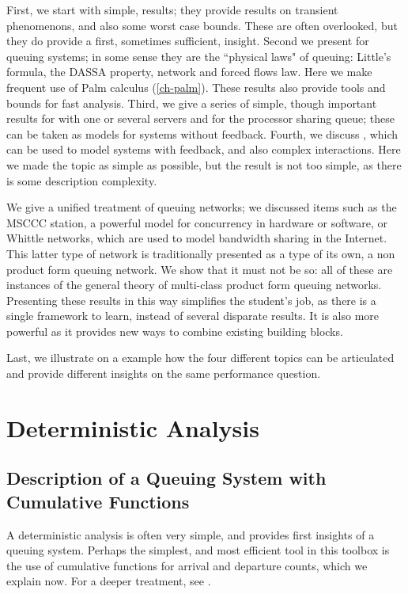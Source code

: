 First, we start with simple,  results; they
provide results on transient phenomenons, and also some worst
case bounds. These are often overlooked, but they do provide a
first, sometimes sufficient, insight. Second we present
 for queuing systems; in some sense they
are the ``physical laws" of queuing: Little's formula, the
DASSA property, network and forced flows law. Here we make
frequent use of Palm calculus (\cref{ch-palm}). These results
also provide tools and bounds for fast analysis.
%
Third, we give a series of simple, though
important results for  with
one or several servers and for the processor
sharing queue; these can be taken as models for
systems without feedback. Fourth, we discuss
, which can be used to
model systems with feedback, and also complex
interactions. Here we made the topic as simple as
possible, but the result is not too simple, as
there is some description complexity.

We give a unified treatment of queuing networks;
we discussed items such as the MSCCC station, a
powerful model for concurrency in hardware or
software, or Whittle networks, which are used to
model bandwidth sharing in the Internet. This
latter type of network is traditionally presented
as a type of its own, a non product form queuing
network. We show that it must not be so: all of
these are instances of the general theory of
multi-class product form queuing networks.
Presenting these results in this way simplifies
the student's job, as there is a single framework
to learn, instead of several disparate results.
It is also more powerful as it provides new ways
to combine existing building blocks.

Last, we illustrate on a example how the four different topics
can be articulated and provide different insights on the same
performance question.

\minitoc
%
\section{Deterministic Analysis}
\subsection{Description of a Queuing System with
Cumulative Functions}  A
deterministic analysis is often very simple, and
provides first insights of a queuing system.
Perhaps the simplest, and most efficient tool in
this toolbox is the use of cumulative functions
for arrival and departure counts, which we
explain now. For a deeper treatment, see
\cite{lt01,Changbook}.
%


